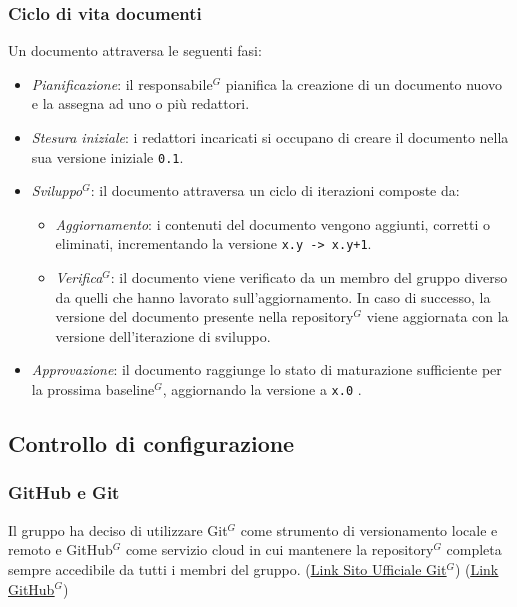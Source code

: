 \documentclass[a4paper,10pt]{article}
\begin{document}
\subsubsection{Ciclo di vita documenti}
Un documento attraversa le seguenti fasi:
\begin{itemize}
  \item \textit{Pianificazione}: il responsabile$^G$ pianifica la creazione di un documento nuovo e la assegna ad uno o più redattori.
  \item \textit{Stesura iniziale}: i redattori incaricati si occupano di creare il documento nella sua versione iniziale \texttt{0.1}.
  \item \textit{Sviluppo$^G$}: il documento attraversa un ciclo di iterazioni composte da:
  \begin{itemize}
    \item \textit{Aggiornamento}: i contenuti del documento vengono aggiunti, corretti o eliminati, incrementando la versione \texttt{x.y -> x.y+1}.
    \item \textit{Verifica$^G$}: il documento viene verificato da un membro del gruppo diverso da quelli che hanno lavorato sull'aggiornamento. In caso di
      successo, la versione del documento presente nella repository$^G$ viene aggiornata con la versione dell'iterazione di sviluppo. 
  \end{itemize}
  \item \textit{Approvazione}: il documento raggiunge lo stato di maturazione sufficiente per la prossima baseline$^G$, aggiornando la versione a \texttt{x.0} .
\end{itemize}

\subsection{Controllo di configurazione}

\subsubsection{GitHub e Git}
Il gruppo ha deciso di utilizzare Git$^G$ come strumento di versionamento locale e remoto e GitHub$^G$ come servizio cloud in cui mantenere la repository$^G$
completa sempre accedibile da tutti i membri del gruppo.
(\href{https://git-scm.com/}{\underline{Link Sito Ufficiale Git$^G$}})
(\href{https://github.com/}{\underline{Link GitHub$^G$}})
\end{document}

